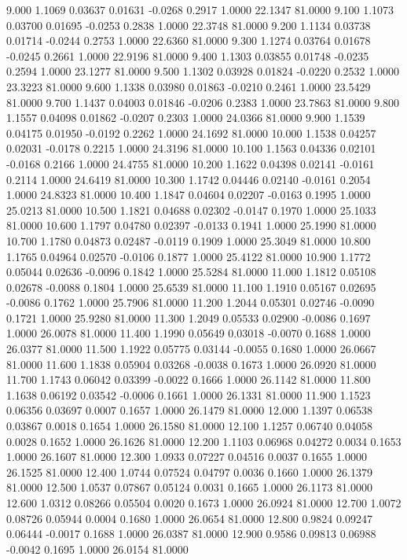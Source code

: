    9.000   1.1069   0.03637   0.01631  -0.0268   0.2917   1.0000  22.1347  81.0000
   9.100   1.1073   0.03700   0.01695  -0.0253   0.2838   1.0000  22.3748  81.0000
   9.200   1.1134   0.03738   0.01714  -0.0244   0.2753   1.0000  22.6360  81.0000
   9.300   1.1274   0.03764   0.01678  -0.0245   0.2661   1.0000  22.9196  81.0000
   9.400   1.1303   0.03855   0.01748  -0.0235   0.2594   1.0000  23.1277  81.0000
   9.500   1.1302   0.03928   0.01824  -0.0220   0.2532   1.0000  23.3223  81.0000
   9.600   1.1338   0.03980   0.01863  -0.0210   0.2461   1.0000  23.5429  81.0000
   9.700   1.1437   0.04003   0.01846  -0.0206   0.2383   1.0000  23.7863  81.0000
   9.800   1.1557   0.04098   0.01862  -0.0207   0.2303   1.0000  24.0366  81.0000
   9.900   1.1539   0.04175   0.01950  -0.0192   0.2262   1.0000  24.1692  81.0000
  10.000   1.1538   0.04257   0.02031  -0.0178   0.2215   1.0000  24.3196  81.0000
  10.100   1.1563   0.04336   0.02101  -0.0168   0.2166   1.0000  24.4755  81.0000
  10.200   1.1622   0.04398   0.02141  -0.0161   0.2114   1.0000  24.6419  81.0000
  10.300   1.1742   0.04446   0.02140  -0.0161   0.2054   1.0000  24.8323  81.0000
  10.400   1.1847   0.04604   0.02207  -0.0163   0.1995   1.0000  25.0213  81.0000
  10.500   1.1821   0.04688   0.02302  -0.0147   0.1970   1.0000  25.1033  81.0000
  10.600   1.1797   0.04780   0.02397  -0.0133   0.1941   1.0000  25.1990  81.0000
  10.700   1.1780   0.04873   0.02487  -0.0119   0.1909   1.0000  25.3049  81.0000
  10.800   1.1765   0.04964   0.02570  -0.0106   0.1877   1.0000  25.4122  81.0000
  10.900   1.1772   0.05044   0.02636  -0.0096   0.1842   1.0000  25.5284  81.0000
  11.000   1.1812   0.05108   0.02678  -0.0088   0.1804   1.0000  25.6539  81.0000
  11.100   1.1910   0.05167   0.02695  -0.0086   0.1762   1.0000  25.7906  81.0000
  11.200   1.2044   0.05301   0.02746  -0.0090   0.1721   1.0000  25.9280  81.0000
  11.300   1.2049   0.05533   0.02900  -0.0086   0.1697   1.0000  26.0078  81.0000
  11.400   1.1990   0.05649   0.03018  -0.0070   0.1688   1.0000  26.0377  81.0000
  11.500   1.1922   0.05775   0.03144  -0.0055   0.1680   1.0000  26.0667  81.0000
  11.600   1.1838   0.05904   0.03268  -0.0038   0.1673   1.0000  26.0920  81.0000
  11.700   1.1743   0.06042   0.03399  -0.0022   0.1666   1.0000  26.1142  81.0000
  11.800   1.1638   0.06192   0.03542  -0.0006   0.1661   1.0000  26.1331  81.0000
  11.900   1.1523   0.06356   0.03697   0.0007   0.1657   1.0000  26.1479  81.0000
  12.000   1.1397   0.06538   0.03867   0.0018   0.1654   1.0000  26.1580  81.0000
  12.100   1.1257   0.06740   0.04058   0.0028   0.1652   1.0000  26.1626  81.0000
  12.200   1.1103   0.06968   0.04272   0.0034   0.1653   1.0000  26.1607  81.0000
  12.300   1.0933   0.07227   0.04516   0.0037   0.1655   1.0000  26.1525  81.0000
  12.400   1.0744   0.07524   0.04797   0.0036   0.1660   1.0000  26.1379  81.0000
  12.500   1.0537   0.07867   0.05124   0.0031   0.1665   1.0000  26.1173  81.0000
  12.600   1.0312   0.08266   0.05504   0.0020   0.1673   1.0000  26.0924  81.0000
  12.700   1.0072   0.08726   0.05944   0.0004   0.1680   1.0000  26.0654  81.0000
  12.800   0.9824   0.09247   0.06444  -0.0017   0.1688   1.0000  26.0387  81.0000
  12.900   0.9586   0.09813   0.06988  -0.0042   0.1695   1.0000  26.0154  81.0000

